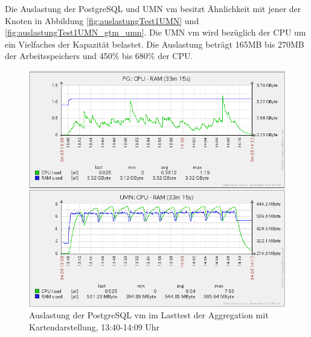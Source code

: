 Die Auslastung der PostgreSQL und UMN \Gls{vm} besitzt Ähnlichkeit mit jener der Knoten in Abbildung \ref{fig:auslastungTest1UMN} und \ref{fig:auslastungTest1UMN_gtm_umn}.
Die UMN \Gls{vm} wird bezüglich der CPU um ein Vielfaches der Kapazität belastet.
Die Auslastung beträgt 165MB bis 270MB der Arbeitsspeichers und 450\%{} bis 680\%{} der CPU.
\begin{figure}[h!]
\centering
\includegraphics[width=\textwidth]{Testergebnisse/umn_aggregation_pg_Testlauf.png}
\caption[Auslastung der PostgreSQL \Gls{vm} im Lasttest der Aggregation mit Kartendarstellung]{Auslastung der PostgreSQL \Gls{vm} im Lasttest der Aggregation mit Kartendarstellung, 13:40-14:09 Uhr}
\label{fig:auslastungTest1UMN_pg}
\end{figure}





